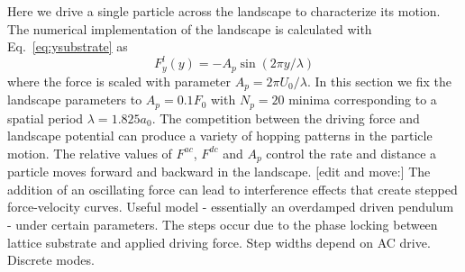 \documentclass[twocolumn,preprintnumbers,amsmath,amssymb,aps,prx]{revtex4}
\begin{document}
Here we drive 
a single particle %
across the landscape %
to characterize its motion.
%
The numerical implementation of the landscape 
is calculated with Eq.~\ref{eq:ysubstrate} as 
\begin{equation}
  \label{eq:force}
  F^l_y(y) = -A_{p} \sin{(2 \pi y / \lambda)} 
\end{equation}
where the force is scaled with parameter $A_{p} = 2\pi U_0/\lambda$.
In this section we fix the landscape parameters
to $A_{p} = 0.1 F_0$ %
with $N_p=20$ minima %
corresponding to a spatial period $\lambda = 1.825 a_0$.
The competition between the driving force and landscape potential
can produce a variety of hopping patterns in the particle motion. 
%
The relative values of $F^{ac}$, $F^{dc}$ and $A_p$
control the rate and distance a  particle moves 
forward and backward in the landscape.
[edit and move:] The addition of an oscillating force
can lead to interference effects
that create stepped force-velocity curves.
Useful model - essentially an overdamped driven pendulum -
under certain parameters.
The steps occur
due to the phase locking between lattice substrate
and applied driving force.
Step widths depend on AC drive.
Discrete modes.
\end{document}
